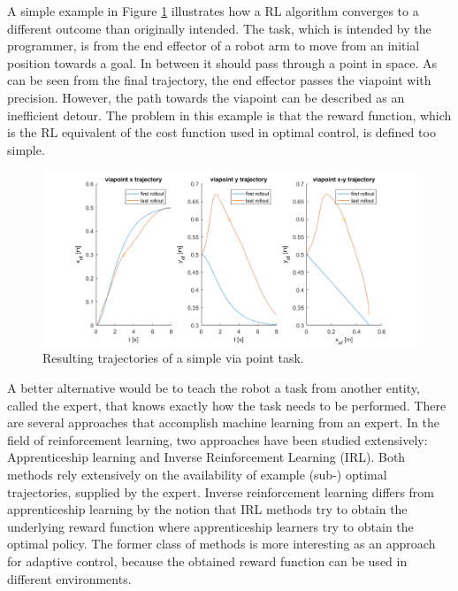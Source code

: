 \documentclass[mscThesis.tex]{subfiles}
\begin{document}
A simple example in Figure \ref{fig:example-task} illustrates how a RL algorithm converges to a different outcome than originally intended. The task, which is intended by the programmer, is from the end effector of a robot arm to move from an initial position towards a goal. In between it should pass through a point in space. As can be seen from the final trajectory, the end effector passes the viapoint with precision. However, the path towards the viapoint can be described as an inefficient detour. The problem in this example is that the reward function, which is the RL equivalent of the cost function used in optimal control, is defined too simple. 

\begin{figure}
\centering
\includegraphics[width=\textwidth, keepaspectratio=1]{figures/trajectory-static-via.png}
\caption{Resulting trajectories of a simple via point task.}
\label{fig:example-task}
\end{figure}

A better alternative would be to teach the robot a task from another entity, called the expert, that knows exactly how the task needs to be performed. There are several approaches that accomplish machine learning from an expert. In the field of reinforcement learning, two approaches have been studied extensively: Apprenticeship learning and Inverse Reinforcement Learning (IRL). Both methods rely extensively on the availability of example (sub-) optimal trajectories, supplied by the expert. Inverse reinforcement learning differs from apprenticeship learning by the notion that IRL methods try to obtain the underlying reward function where apprenticeship learners try to obtain the optimal policy. The former class of methods is more interesting as an approach for adaptive control, because the obtained reward function can be used in different environments. 
\end{document}
